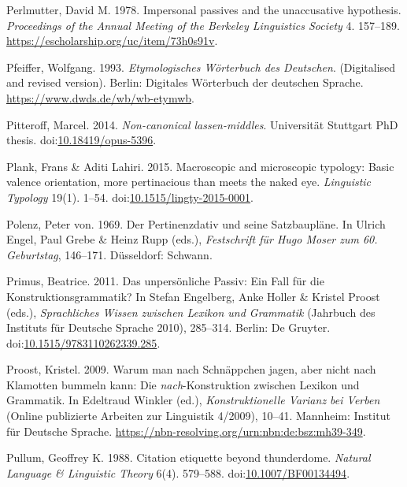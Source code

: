 \leavevmode{}%
Perlmutter, David M. 1978. Impersonal passives and the unaccusative
hypothesis. \emph{Proceedings of the Annual Meeting of the Berkeley
Linguistics Society} 4. 157--189.
\url{https://escholarship.org/uc/item/73h0s91v}.

\leavevmode{}%
Pfeiffer, Wolfgang. 1993. \emph{Etymologisches {Wörterbuch} des
{Deutschen}}. (Digitalised and revised version). Berlin: Digitales
{Wörterbuch} der deutschen {Sprache}.
\url{https://www.dwds.de/wb/wb-etymwb}.

\leavevmode{}%
Pitteroff, Marcel. 2014. \emph{Non-canonical \emph{lassen}-middles}.
Universität Stuttgart PhD thesis.
doi:\href{https://doi.org/10.18419/opus-5396}{10.18419/opus-5396}.

\leavevmode{}%
Plank, Frans \& Aditi Lahiri. 2015. Macroscopic and microscopic
typology: Basic valence orientation, more pertinacious than meets the
naked eye. \emph{Linguistic Typology} 19(1). 1--54.
doi:\href{https://doi.org/10.1515/lingty-2015-0001}{10.1515/lingty-2015-0001}.

\leavevmode{}%
Polenz, Peter von. 1969. Der {Pertinenzdativ} und seine {Satzbaupläne}.
In Ulrich Engel, Paul Grebe \& Heinz Rupp (eds.), \emph{Festschrift für
{Hugo Moser} zum 60. {Geburtstag}}, 146--171. Düsseldorf: Schwann.

\leavevmode{}%
Primus, Beatrice. 2011. Das unpersönliche {Passiv}: Ein {Fall} für die
{Konstruktionsgrammatik}? In Stefan Engelberg, Anke Holler \& Kristel
Proost (eds.), \emph{Sprachliches {Wissen} zwischen {Lexikon} und
{Grammatik}} (Jahrbuch {des} Instituts {für} Deutsche Sprache 2010),
285--314. Berlin: De Gruyter.
doi:\href{https://doi.org/10.1515/9783110262339.285}{10.1515/9783110262339.285}.

\leavevmode{}%
Proost, Kristel. 2009. Warum man nach {Schnäppchen} jagen, aber nicht
nach {Klamotten} bummeln kann: {Die} \emph{nach}-{Konstruktion} zwischen
{Lexikon} und {Grammatik}. In Edeltraud Winkler (ed.),
\emph{Konstruktionelle {Varianz} bei {Verben}} (Online {publizierte}
Arbeiten {zur} Linguistik 4/2009), 10--41. Mannheim: Institut für
Deutsche Sprache.
\url{https://nbn-resolving.org/urn:nbn:de:bsz:mh39-349}.

\leavevmode{}%
Pullum, Geoffrey K. 1988. Citation etiquette beyond thunderdome.
\emph{Natural Language \& Linguistic Theory} 6(4). 579--588.
doi:\href{https://doi.org/10.1007/BF00134494}{10.1007/BF00134494}.


